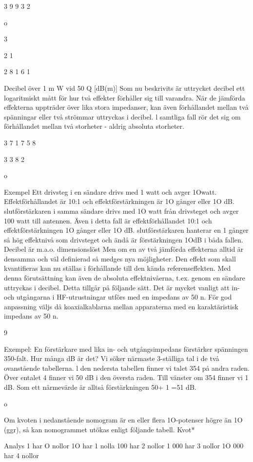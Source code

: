 3
9
9
3
2

o

3

2
1

2
8
1
6
1

Decibel över 1 m W vid 50 Q [dB(m)]
Som nu beskrivits är uttrycket decibel ett
logaritmiskt mått för hur två effekter förhåller
sig till varandra. När de jämförda effekterna
uppträder över lika stora impedanser, kan
även förhållandet mellan två spänningar eller två strömmar uttryckas i decibel. l samtliga fall rör det sig om förhållandet mellan två
storheter - aldrig absoluta storheter.

3
7
1
7
5
8

3
3
8
2

o

Exempel
Ett drivsteg i en sändare drivs med 1 watt och
avger 1Owatt. Effektförhållandet är 10:1 och
effektförstärkningen är 1O gånger eller 1O
dB. slutförstärkaren i samma sändare drivs
med 1O watt från drivsteget och avger 100
watt till antennen. Även i detta fall är effektförhållandet 10:1 och effektförstärkningen
1O gånger eller 1O dB.
slutförstärkaren hanterar en 1 gånger
så hög effektnivå som drivsteget och ändå är
förstärkningen 1OdB i båda fallen. Decibel är
m.a.o. dimensionslöst
Men om en av två jämförda effekterna
alltid är densamma och väl definierad så
medges nya möjligheter. Den effekt som
skall kvantifieras kan nu ställas i förhållande
till den kända referenseffekten. Med denna
förutsättning kan även de absoluta effektnivåerna, t.ex. genom en sändare uttryckas
i decibel. Detta tillgår på följande sätt.
Det är mycket vanligt att in- och utgångarna i HF-utrustningar utförs med en impedans av 50 n. För god anpassning väljs
då koaxialkablarna mellan apparaterna med
en karaktäristisk impedans av 50 n.

9

Exempel:
En förstärkare med lika in- och utgångsimpedans förstärker spänningen 350-falt.
Hur många dB är det?
Vi söker närmaste 3-ställiga tal i de två
ovanstående tabellerna. l den nedersta tabellen finner vi talet 354 på andra raden.
Över entalet 4 finner vi 50 dB i den översta
raden. Till vänster om 354 finner vi 1 dB.
Som ett närmevärde är alltså förstärkningen
50+ 1 =51 dB.

o

Om kvoten i nedanstående nomogram är en
eller flera 1O-potenser högre än 1O (ggr), så
kan nomogrammet utökas enligt följande
tabell.
Kvot*

Analys
1 har O nollor
1O har 1 nolla
100 har 2 nollor
1 000 har 3 nollor
1O 000 har 4 nollor


